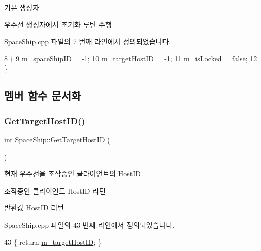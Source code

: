 기본 생성자 

우주선 생성자에서 초기화 루틴 수행 

Space\+Ship.\+cpp 파일의 7 번째 라인에서 정의되었습니다.


\begin{DoxyCode}
8 \{
9     \hyperlink{class_space_ship_a03b4dcfdfa8771db1e462eb6b9b15055}{m\_spaceShipID} = -1;
10     \hyperlink{class_space_ship_a7b8bd199405824c96906094a2e1312c6}{m\_targetHostID} = -1;
11     \hyperlink{class_space_ship_afc1bca7c7439f00cd66b4f415e76f0f6}{m\_isLocked} = \textcolor{keyword}{false};
12 \}
\end{DoxyCode}


\subsection{멤버 함수 문서화}
\mbox{\label{class_space_ship_adbe10320ea9f3310ee2bf2bc207632fe}} 
\subsubsection{\texorpdfstring{Get\+Target\+Host\+I\+D()}{GetTargetHostID()}}
{\footnotesize\ttfamily int Space\+Ship\+::\+Get\+Target\+Host\+ID (\begin{DoxyParamCaption}{ }\end{DoxyParamCaption})}



현재 우주선을 조작중인 클라이언트의 Host\+ID 

조작중인 클라이언트 Host\+ID 리턴

\begin{DoxyReturn}{반환값}
Host\+ID 리턴 
\end{DoxyReturn}


Space\+Ship.\+cpp 파일의 43 번째 라인에서 정의되었습니다.


\begin{DoxyCode}
43 \{ \textcolor{keywordflow}{return} \hyperlink{class_space_ship_a7b8bd199405824c96906094a2e1312c6}{m\_targetHostID}; \}
\end{DoxyCode}
\mbox{\label{class_space_ship_aaf915c204b3688322dfb995701f7d6ed}} 
